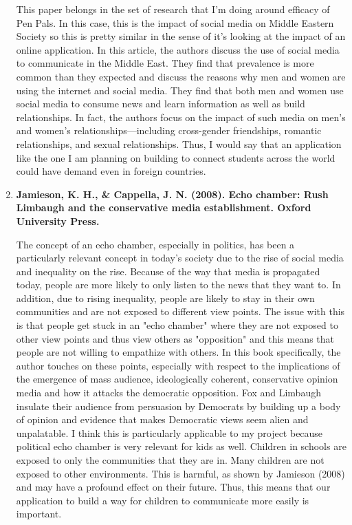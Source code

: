 \documentclass[12pt, final]{article}
\begin{document}
\begin{enumerate}
This paper belongs in the set of research that I'm doing around efficacy of Pen Pals. In this case, this is the impact of social media on Middle Eastern Society so this is pretty similar in the sense of it's looking at the impact of an online application. In this article, the authors discuss the use of social media to communicate in the Middle East. They find that prevalence is more common than they expected and discuss the reasons why men and women are using the internet and social media. They find that both men and women use social media to consume news and learn information as well as build relationships. In fact, the authors focus on the impact of such media on men's and women's relationships—including cross-gender friendships, romantic relationships, and sexual relationships. Thus, I would say that an application like the one I am planning on building to connect students across the world could have demand even in foreign countries. 

\item \textbf{Jamieson, K. H., \& Cappella, J. N. (2008). Echo chamber: Rush Limbaugh and the conservative media establishment. Oxford University Press.}

The concept of an echo chamber, especially in politics, has been a particularly relevant concept in today's society due to the rise of social media and inequality on the rise. Because of the way that media is propagated today, people are more likely to only listen to the news that they want to. In addition, due to rising inequality, people are likely to stay in their own communities and are not exposed to different view points. The issue with this is that people get stuck in an "echo chamber" where they are not exposed to other view points and thus view others as "opposition" and this means that people are not willing to empathize with others. In this book specifically, the author touches on these points, especially with respect to the implications of the emergence of mass audience, ideologically coherent, conservative opinion media and how it attacks the democratic opposition. Fox and Limbaugh insulate their audience from persuasion by Democrats by building up a body of opinion and evidence that makes Democratic views seem alien and unpalatable. I think this is particularly applicable to my project because political echo chamber is very relevant for kids as well. Children in schools are exposed to only the communities that they are in. Many children are not exposed to other environments. This is harmful, as shown by Jamieson (2008) and may have a profound effect on their future. Thus, this means that our application to build a way for children to communicate more easily is important.


\end{enumerate}
\end{document}
